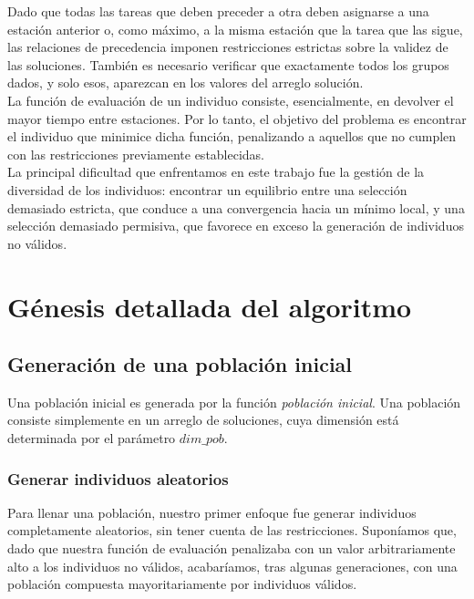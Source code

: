 \documentclass[12pt]{report}
\begin{document}
Dado que todas las tareas que deben preceder a otra deben asignarse a una estación anterior o, como máximo, a la misma estación que la tarea que las sigue, 
las relaciones de precedencia imponen restricciones estrictas sobre la validez de las soluciones. También es necesario verificar que exactamente todos los grupos dados, y solo esos, aparezcan en los valores del arreglo solución.\\

La función de evaluación de un individuo consiste, esencialmente, en devolver el mayor tiempo entre estaciones. Por lo tanto, el objetivo del problema es encontrar el individuo que minimice dicha función, penalizando a aquellos que no cumplen con las restricciones previamente establecidas.\\

La principal dificultad que enfrentamos en este trabajo fue la gestión de la diversidad de los individuos: encontrar un equilibrio entre una selección demasiado estricta, que conduce a una convergencia hacia un mínimo local, y una selección demasiado permisiva, que favorece en exceso la generación de individuos no válidos.

\chapter{Génesis detallada del algoritmo}

\section{Generación de una población inicial}

Una población inicial es generada por la función \textit{población inicial}. Una población consiste simplemente en un arreglo de soluciones, cuya dimensión está determinada por el parámetro $dim\_pob$.

\subsection*{Generar individuos aleatorios}

Para llenar una población, nuestro primer enfoque fue generar individuos completamente aleatorios, sin tener cuenta de las restricciones. Suponíamos que, dado que nuestra función de evaluación penalizaba con un valor arbitrariamente alto a los individuos no válidos, acabaríamos, tras algunas generaciones, con una población compuesta mayoritariamente por individuos válidos.\\
\end{document}
